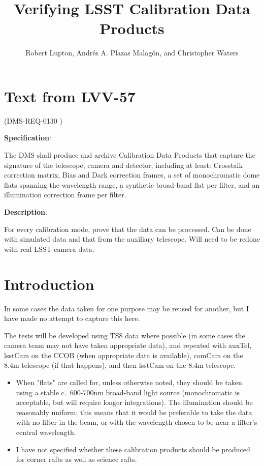 \documentclass[DM,authoryear,toc,lsstdraft]{lsstdoc}
\title{Verifying LSST Calibration Data Products}
\author{%
Robert Lupton,
Andrés A. Plazas Malagón,
and
Christopher Waters
}
\date{\vcsDate}
\begin{document}

\maketitle

\renewcommand{\secRef}[1]{Sec. \ref{#1}}
\section{Text from LVV-57}

(DMS-REQ-0130 )

\textbf{Specification}:

The DMS shall produce and archive Calibration Data Products that capture the signature of the
telescope, camera and detector, including at least: Crosstalk correction matrix, Bias and Dark correction
frames, a set of monochromatic dome flats spanning the wavelength range, a synthetic broad-band flat per
filter, and an illumination correction frame per filter.

\textbf{Description}:

For every calibration mode, prove that the data can be processed. Can be done with simulated data and that
from the auxiliary telescope. Will need to be redone with real LSST camera data.

\section{Introduction}

In some cases the data taken for one purpose may be reused for another, but I have made no attempt to
capture this here.

The tests will be developed using TS8 data where possible (in some cases the camera team may not have taken
appropriate data), and repeated with auxTel, lsstCam on the CCOB (when appropriate data is available), comCam
on the 8.4m telescope (if that happens), and then lsstCam on the 8.4m telescope.

\begin{itemize}
\item When "flats" are called for, unless otherwise noted, they should be taken using a stable c.\ 600-700nm
broad-band light source (monochromatic is acceptable, but will require longer integrations). The illumination
should be reasonably uniform; this means that it would be preferable to take the data with no filter in the
beam, or with the wavelength chosen to be near a filter's central wavelength.

\item I have not specified whether these calibration products should be produced for corner rafts as well as science rafts.
\end{itemize}
\end{document}
